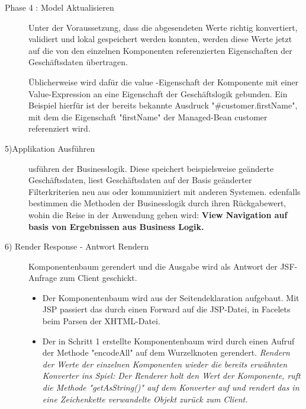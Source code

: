 \documentclass[a4paper,10pt]{scrreprt}
\begin{document}
{\begin{description}
\item[Phase 4 : Model Aktualisieren] Unter der Voraussetzung, dass die abgesendeten Werte richtig konvertiert, validiert und lokal
gespeichert werden konnten, werden diese Werte jetzt auf die von den einzelnen Komponenten
referenzierten Eigenschaften der Geschäftsdaten übertragen.

Üblicherweise wird dafür die value -Eigenschaft der Komponente mit einer Value-Expression an eine
Eigenschaft der Geschäftslogik gebunden. Ein Beispiel hierfür ist der bereits bekannte Ausdruck
"\#{customer.firstName}", mit dem die Eigenschaft "firstName" der Managed-Bean customer
referenziert wird.
\item [5)Applikation Ausführen] usführen der Businesslogik. Diese speichert beispielsweise geänderte
Geschäftsdaten, liest Geschäftsdaten auf der Basis geänderter Filterkriterien neu aus oder
kommuniziert mit anderen Systemen.
edenfalls bestimmen die Methoden der Businesslogik durch
ihren Rückgabewert, wohin die Reise in der Anwendung gehen wird: \textbf{View Navigation auf basis von Ergebnissen aus Business Logik.}

\item[6) Render Response - Antwort Rendern] Komponentenbaum gerendert und die Ausgabe wird als Antwort der
JSF-Anfrage zum Client geschickt.
\begin{itemize}
 \item Der Komponentenbaum wird aus der Seitendeklaration aufgebaut. Mit JSP passiert das durch
einen Forward auf die JSP-Datei, in Facelets beim Parsen der XHTML-Datei.
\item Der in Schritt 1 erstellte Komponentenbaum wird durch einen Aufruf der Methode "encodeAll"
auf dem Wurzelknoten gerendert.
\textit{Rendern der Werte der einzelnen Komponenten wieder die
bereits erwähnten Konverter ins Spiel: Der Renderer holt den Wert der Komponente, ruft die
Methode "getAsString()" auf dem Konverter auf und rendert das in eine Zeichenkette verwandelte
Objekt zurück zum Client.}

\end{itemize}

\end{description}

}
\end{document}
